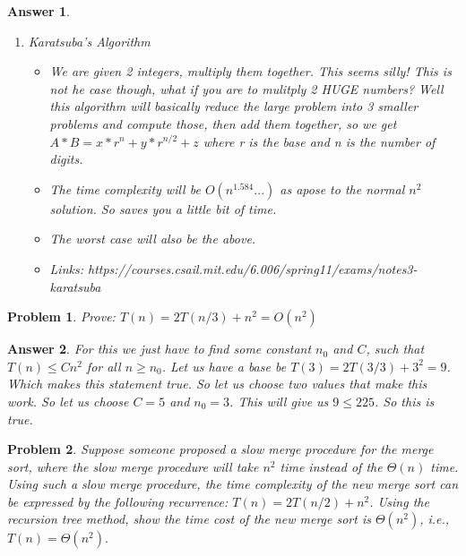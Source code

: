 \documentclass[11pt]{article}
\newtheorem{problem}{Problem}
\newtheorem{answer}{Answer}
\begin{document}
\begin{answer}
\begin{enumerate}
\begin{itemize}
 	\end{itemize}
 	\item Karatsuba's Algorithm
 	\begin{itemize}
 		\item We are given 2 integers, multiply them together. This seems silly! This is not he case though, what if you are to mulitply 2 HUGE numbers? Well this algorithm will basically reduce the large problem into 3 smaller problems and compute those, then add them together, so we get $A*B = x*r^n + y*r^{n/2} + z$ where r is the base and n is the number of digits.
 		\item The time complexity will be $O(n^1.584...)$ as apose to the normal $n^2$ solution. So saves you a little bit of time.
 		\item The worst case will also be the above.
 		\item Links: https://courses.csail.mit.edu/6.006/spring11/exams/notes3-karatsuba
 	\end{itemize}
 \end{enumerate}
\end{answer}

\bigskip

\begin{problem}
 \label{prob:4}
 Prove: $T(n) = 2T(n/3) + n^2 = O(n^2)$
\end{problem}

\begin{answer}
 \label{ans:1}
 For this we just have to find some constant $n_0$ and $C$, such that $T(n) \leq Cn^2$ for all $n \geq n_0$. Let us have a base be $T(3)  = 2T(3/3) + 3^2 = 9$. Which makes this statement true. So let us choose two values that make this work. So let us choose $C = 5$ and $n_0 = 3$. This will give us $9 \leq 225$. So this is true.
\end{answer}

\bigskip

\begin{problem}
 \label{prob:5} Suppose someone proposed a slow merge procedure for the merge sort, where the slow merge procedure will take $n^2$ time instead of the $\Theta{(n)}$ time. Using such a slow merge procedure, the time complexity of the new merge sort can be expressed by the following recurrence: $T(n) = 2T(n/2) + n^2$. Using the recursion tree method, show the time cost of the new merge sort is $\Theta{(n^2)}$, i.e., $T(n) = \Theta{(n^2)}.$
\end{problem}
\end{document}
